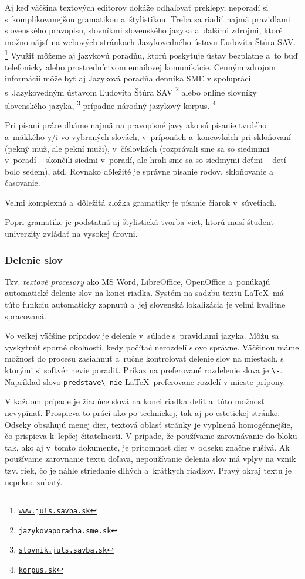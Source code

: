 Aj keď väčšina textových editorov dokáže odhaľovať preklepy, 
neporadí si s~komplikovanejšou gramatikou a~štylistikou.
Treba sa riadiť najmä pravidlami slovenského pravopisu,
slovníkmi slovenského jazyka a~ďalšími zdrojmi,
ktoré možno nájsť na webových stránkach
Jazykovedného ústavu Ľudovíta Štúra SAV.%
\footnote{\href{https://www.juls.savba.sk/}{\tt www.juls.savba.sk}}
Využiť môžeme aj jazykovú poradňu,
ktorú poskytuje ústav bezplatne a~to buď telefonicky alebo 
prostredníctvom emailovej komunikácie.
Cenným zdrojom informácií môže byť aj Jazyková poradňa
denníka SME v spolupráci
s~Jazykovedným ústavom Ľudovíta Štúra SAV%
\footnote{\href{https://jazykovaporadna.sme.sk/}{\tt jazykovaporadna.sme.sk}}
alebo online slovníky slovenského jazyka,%
\footnote{\href{https://slovnik.juls.savba.sk/}{\tt slovnik.juls.savba.sk}}
prípadne národný jazykový korpus.%
\footnote{\href{https://korpus.sk/}{\tt korpus.sk}}

Pri písaní práce dbáme najmä na pravopisné javy ako sú písanie 
tvrdého a~mäkkého y/i vo vybraných slovách,
v~príponách a~koncovkách pri skloňovaní
(pekný muž, ale pekní muži),
v~číslovkách (rozprávali sme sa so siedmimi v~poradí
-- skončili siedmi v~poradí,
ale hrali sme sa so siedmymi deťmi -- detí bolo sedem), atď. 
Rovnako dôležité je správne písanie rodov,
skloňovanie a časovanie.

Veľmi komplexná a~dôležitá zložka gramatiky
je písanie čiarok v~súvetiach.

Popri gramatike je podstatná aj štylistická tvorba viet,
ktorú musí študent univerzity zvládať na vysokej úrovni.

\subsubsection{Delenie slov}
Tzv. \emph{textové procesory} ako MS Word, LibreOffice, OpenOffice 
a~ponúkajú automatické delenie slov na konci riadka.
Systém na sadzbu textu \LaTeX\ má túto funkciu automaticky zapnutú a~jej slovenská lokalizácia je veľmi kvalitne spracovaná.

Vo veľkej väčšine prípadov je delenie
v~súlade s~pravidlami jazyka.
Môžu sa vyskytnúť sporné okolnosti,
kedy počítač nerozdelí slovo správne.
Väčšinou máme možnosť do procesu zasiahnuť
a~ručne kontrolovať delenie slov na miestach,
s ktorými si softvér nevie poradiť.
Príkaz na preferované rozdelenie slova je \verb|\-|.
Napríklad slovo \verb|predstave\-nie| \LaTeX\ 
preferovane rozdelí v mieste prípony.

V každom prípade je žiadúce slová na konci riadka deliť
a\ túto možnosť nevypínať. 
Prospieva to práci ako po technickej,
tak aj po estetickej stránke.
Odseky obsahujú menej dier,
textová oblasť stránky je vyplnená homogénnejšie,
čo prispieva k~lepšej čitateľnosti.
V prípade, že používame zarovnávanie do bloku tak,
ako aj v~tomto dokumente,
je prítomnosť dier v~odseku značne rušivá.
Ak používame zarovnanie textu doľava,
nepoužívanie delenia slov má vplyv na vznik tzv. riek,
čo je náhle striedanie dlhých a~krátkych riadkov.
Pravý okraj textu je nepekne zubatý.

